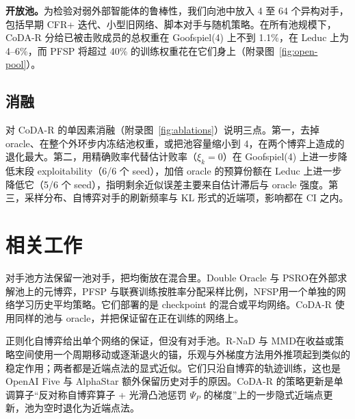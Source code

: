 \documentclass{article}
\theoremstyle{plain}
\theoremstyle{remark}
\newcommand{\codar}{CoDA-R}
\begin{document}
\textbf{开放池。}为检验对弱外部智能体的鲁棒性，我们向池中放入 4 至 64 个异构对手，包括早期 CFR+ 迭代、小型旧网络、脚本对手与随机策略。在所有池规模下，\codar{} 分给已被击败成员的总权重在 Goofspiel(4) 上不到 1.1\%，在 Leduc 上为 4--6\%，而 PFSP 将超过 40\% 的训练权重花在它们身上（附录图~\ref{fig:open-pool}）。

\subsection{消融}
\label{sec:exp-abl}

对 \codar{} 的单因素消融（附录图~\ref{fig:ablations}）说明三点。第一，去掉 oracle、在整个外环步内冻结池权重，或把池容量缩小到 4，在两个博弈上造成的退化最大。第二，用精确败率代替估计败率（$\xi_k=0$）在 Goofspiel(4) 上进一步降低末段 exploitability（6/6 个 seed），加倍 oracle 的预算份额在 Leduc 上进一步降低它（5/6 个 seed），指明剩余近似误差主要来自估计滞后与 oracle 强度。第三，采样分布、自博弈对手的刷新频率与 KL 形式的近端项，影响都在 CI 之内。

\section{相关工作}
\label{sec:related}

对手池方法保留一池对手，把均衡放在混合里。Double Oracle 与 PSRO\citep{mcmahan2003doubleoracle,lanctot2017psro,muller2020generalized,mcaleer2020pipeline}在外部求解池上的元博弈\citep{wellman2006egta}，PFSP 与联赛训练\citep{vinyals2019alphastar}按胜率分配采样比例，NFSP\citep{heinrich2015fsp,heinrich2016nfsp}用一个单独的网络学习历史平均策略。它们部署的是 checkpoint 的混合或平均网络。\codar{} 使用同样的池与 oracle，并把保证留在正在训练的网络上。

正则化自博弈给出单个网络的保证，但没有对手池。R-NaD 与 MMD\citep{perolat2021rnad,perolat2022stratego,sokota2023mmd}在收益或策略空间使用一个周期移动或逐渐退火的锚，乐观与外梯度方法\citep{daskalakis2018optimism,mertikopoulos2019omd,nemirovski2004prox,cen2021extragradient}用外推项起到类似的稳定作用；两者都是近端点法\citep{rockafellar1976ppa}的显式近似\citep{mokhtari2020ppa}。它们只沿自博弈的轨迹训练，这也是 OpenAI Five 与 AlphaStar 额外保留历史对手的原因\citep{openai2019dota,vinyals2019alphastar,czarnecki2020spinning}。\codar{} 的策略更新是单调算子“反对称自博弈算子 + 光滑凸池惩罚 $\Psi_P$ 的梯度”上的一步隐式近端点更新，池为空时退化为近端点法。
\end{document}
